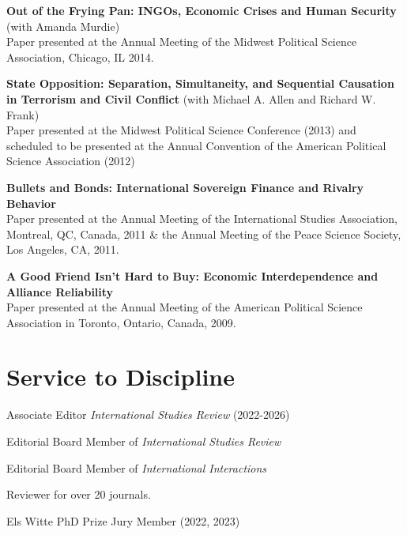 \documentclass[letterpaper]{article}
\renewenvironment{itemize}{
  \begin{list}{}{
    \setlength{\leftmargin}{1.75em}
  }
}{
  \end{list}
}
\begin{document}
\begin{itemize}
\item \textbf{Out of the Frying Pan: INGOs, Economic Crises and Human Security} (with Amanda Murdie)  \\
Paper presented at the Annual Meeting of the Midwest Political Science Association, Chicago, IL  2014. 

\item \textbf{State Opposition: Separation, Simultaneity, and Sequential Causation in Terrorism and Civil Conflict} (with Michael A. Allen and Richard W. Frank) \\
Paper presented at the Midwest Political Science Conference (2013) and scheduled to be presented at the Annual Convention of the American Political Science Association (2012)

\item \textbf{Bullets and Bonds: International Sovereign Finance and Rivalry Behavior} \\
Paper presented at the Annual Meeting of the International Studies Association, Montreal, QC, Canada, 2011 \& the Annual Meeting of the Peace Science Society, Los Angeles, CA, 2011.

\item \textbf{A Good Friend Isn't Hard to Buy: Economic Interdependence and Alliance Reliability}\\
 Paper presented at the Annual Meeting of the American Political Science Association in Toronto, Ontario, Canada, 2009. 
 


\end{itemize}

\section*{Service to Discipline}
	\begin{itemize}
		\item Associate Editor \textit{International Studies Review} (2022-2026)
		\item Editorial Board Member of \textit{International Studies Review}
		\item Editorial Board Member of \textit{International Interactions}
		\item Reviewer for over 20 journals. 
		\item Els Witte PhD Prize Jury Member (2022, 2023)
	\end{itemize}
	
\end{document}
